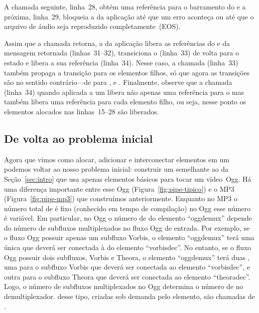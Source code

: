 \documentclass{SBCbookchapter}
\begin{document}
A chamada seguinte, linha~28, obtém uma referência para o barramento do
 e a próxima, linha~29, bloqueia a  da aplicação até
que um erro aconteça ou até que o arquivo de áudio seja reproduzido
completamente~(EOS).

Assim que a chamada  retorna, a  da
aplicação libera as referências do  e da mensagem retornada
(linhas~31--32), transiciona o  (linha~33) de volta para o
estado  e libera a sua referência (linha~34).  Nesse caso, a
chamada  (linha~33) também propaga a transição para
os elementos filhos, só que agora as transições são no sentido
contrário---de  para ,  e .
Finalmente, observe que a chamada  (linha~34) quando
aplicada a um  libera não apenas uma referência para o  mas
também libera uma referência para cada elemento filho, ou seja, nesse ponto
os elementos alocados nas linhas~15--28 são liberados.


\subsection*{De volta ao problema inicial}

Agora que vimos como alocar, adicionar e interconectar elementos em um
 podemos voltar ao nosso problema inicial: construir um
 semelhante ao da Seção~\ref{sec:intro} que usa apenas
elementos básicos para tocar um vídeo~Ogg.  Há uma diferença importante
entre esse  Ogg (Figura~\ref{fig:pipe-tipico}) e o
 MP3 (Figura~\ref{fig:pipe-mp3}) que construímos anteriormente.
Enquanto no  MP3 o número total de  é fixo (conhecido
em tempo de compilação) no  Ogg esse número é variável.  Em
particular, no  Ogg o número de  do elemento
``oggdemux'' depende do número de subfluxos multiplexados no fluxo Ogg de
entrada.  Por exemplo, se o fluxo Ogg possuir apenas um subfluxo Vorbis, o
elemento ``oggdemux'' terá uma única  que deverá ser conectada
à  do elemento ``vorbisdec''.  No entanto, se o fluxo Ogg
possuir dois subfluxos, Vorbis e Theora, o elemento ``oggdemux'' terá duas
, uma para o subfluxo Vorbis que deverá ser conectada ao
elemento ``vorbisdec'', e outra para o subfluxo Theora que deverá ser
conectada ao elemento ``theoradec''.  Logo, o número de subfluxos
multiplexados no Ogg determina o número de  no
demultiplexador.   desse tipo, criadas sob demanda pelo elemento,
são chamadas de .
\end{document}
